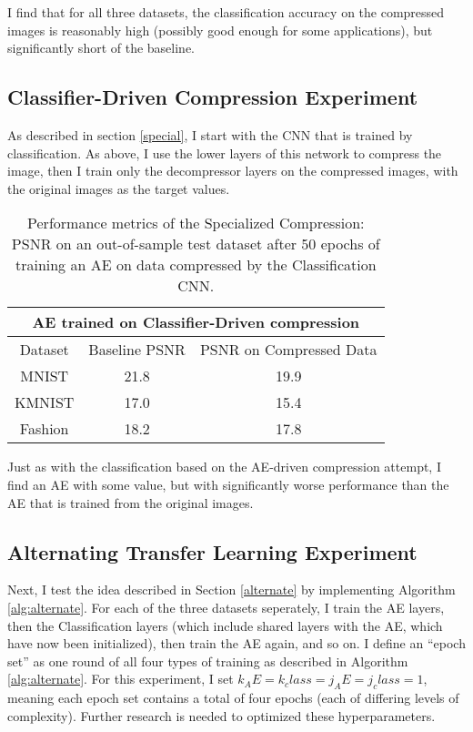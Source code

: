 \documentclass[twoside,11pt]{article}
\begin{document}
I find that for all three datasets, the classification accuracy on the compressed images
is reasonably high (possibly good enough for some applications), but significantly 
short of the baseline.


\subsection{Classifier-Driven Compression Experiment}

As described in section \ref{special}, I start with the CNN that is trained by classification.
As above, I use the lower layers of this network to compress the image, then I train
only the decompressor layers on the compressed images, with the original images
as the target values.


\begin{table}[h]
  \centering
  \begin{tabular}{|c||c|c|}
    \hline
    \multicolumn{3}{|c|}{AE trained on Classifier-Driven compression}\\
    \hline
    Dataset & Baseline PSNR & PSNR on Compressed Data \\
    \hline
    MNIST & 21.8 & 19.9\\
    \hline
    KMNIST & 17.0 & 15.4\\
    \hline
    Fashion & 18.2 & 17.8\\
    \hline
  \end{tabular}
  \caption{Performance metrics of the Specialized Compression: 
   PSNR on an out-of-sample test dataset after 50 epochs of training an AE on
   data compressed by the Classification CNN.}
  \label{table:special}
\end{table}

Just as with the classification based on the AE-driven compression attempt, 
I find an AE with some value, but with 
significantly worse performance than the AE that is trained from the original images.

\subsection{Alternating Transfer Learning Experiment}

Next, I test the idea described in Section \ref{alternate} by implementing Algorithm \ref{alg:alternate}.
For each of the three datasets seperately, I train the AE layers, then the Classification layers
(which include shared layers with the AE, which have now been initialized), then train the AE again,
and so on. I define an ``epoch set'' as one round of all four types of training as described in 
Algorithm \ref{alg:alternate}. For this experiment, I set $k_AE = k_class = j_AE = j_class = 1$, 
meaning each epoch set contains a total of four epochs (each of differing levels of complexity).
Further research is needed to optimized these hyperparameters.
\end{document}
